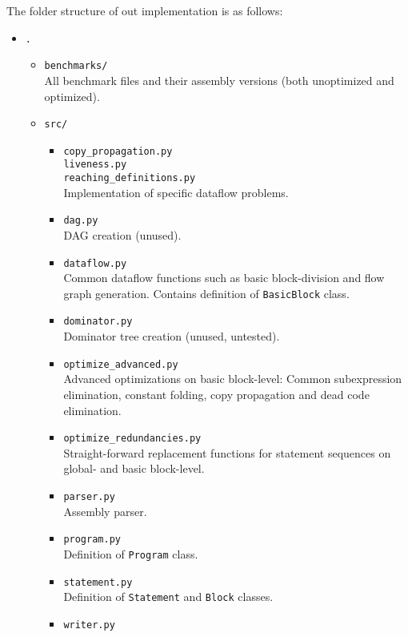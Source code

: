 \documentclass[10pt,a4paper]{article}
\begin{document}
The folder structure of out implementation is as follows:
\begin{itemize}
\item \texttt{.}
    \begin{itemize}
    \item \texttt{benchmarks/} \\
        All benchmark files and their assembly versions (both unoptimized and
        optimized).
    \item \texttt{src/}
        \begin{itemize}
        \item \texttt{copy\_propagation.py} \\
              \texttt{liveness.py} \\
              \texttt{reaching\_definitions.py} \\
              Implementation of specific dataflow problems.
        \item \texttt{dag.py} \\
            DAG creation (unused).
        \item \texttt{dataflow.py} \\
            Common dataflow functions such as basic block-division and flow
            graph generation. Contains definition of \texttt{BasicBlock} class.
        \item \texttt{dominator.py} \\
            Dominator tree creation (unused, untested).
        \item \texttt{optimize\_advanced.py} \\
            Advanced optimizations on basic block-level: Common subexpression
            elimination, constant folding, copy propagation and dead code
            elimination.
        \item \texttt{optimize\_redundancies.py} \\
            Straight-forward replacement functions for statement sequences on
            global- and basic block-level.
        \item \texttt{parser.py} \\
            Assembly parser.
        \item \texttt{program.py} \\
            Definition of \texttt{Program} class.
        \item \texttt{statement.py} \\
            Definition of \texttt{Statement} and \texttt{Block} classes.
        \item \texttt{writer.py} \\

\end{itemize}
\end{itemize}
\end{itemize}
\end{document}
